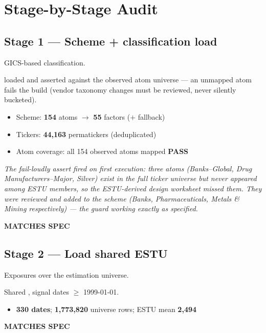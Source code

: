 \documentclass[11pt,a4paper]{article}
\newcommand{\PASS}[1]{\textcolor{pass}{\textbf{#1}}}
\newcommand{\NOTE}[1]{\textcolor{note}{\textit{#1}}}
\begin{document}
\section{Stage-by-Stage Audit}

\subsection{Stage 1 --- Scheme + classification load}

\begin{description}[style=nextline]
  \item[PDF SPEC] GICS-based classification.
  \item[Implementation]  loaded and asserted against the
    observed atom universe --- an unmapped atom fails the build (vendor taxonomy
    changes must be reviewed, never silently bucketed).
  \item[Observed]\phantom{x}
    \begin{itemize}[nosep, topsep=-\parskip]
      \item Scheme: \textbf{154} atoms $\to$ \textbf{55} factors ($+$ fallback)
      \item Tickers: \textbf{44{,}163} permatickers (deduplicated)
      \item Atom coverage: all 154 observed atoms mapped \PASS{PASS}
    \end{itemize}
  \item[Deviation] \NOTE{The fail-loudly assert fired on first execution: three
    atoms (Banks--Global, Drug Manufacturers--Major, Silver) exist in the full
    ticker universe but never appeared among ESTU members, so the ESTU-derived
    design worksheet missed them. They were reviewed and added to the scheme
    (Banks, Pharmaceuticals, Metals \& Mining respectively) --- the guard working
    exactly as specified.}
  \item[Status] \PASS{MATCHES SPEC}
\end{description}

\subsection{Stage 2 --- Load shared ESTU}

\begin{description}[style=nextline]
  \item[PDF SPEC] Exposures over the estimation universe.
  \item[Implementation] Shared , signal dates
    $\geq$ 1999-01-01.
  \item[Observed]\phantom{x}
    \begin{itemize}[nosep, topsep=-\parskip]
      \item \textbf{330 dates}; \textbf{1{,}773{,}820} universe rows;
        ESTU mean \textbf{2{,}494}
    \end{itemize}
  \item[Status] \PASS{MATCHES SPEC}
\end{description}
\end{document}
